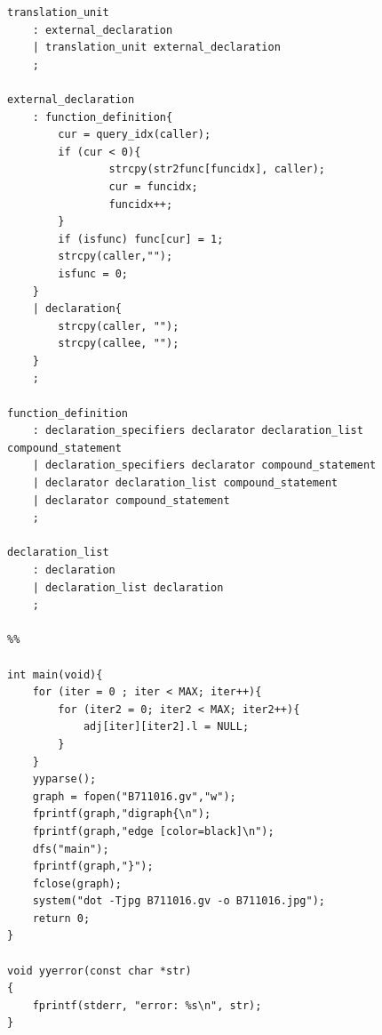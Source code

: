 \documentclass{article}
\begin{document}
\begin{verbatim}
translation_unit
	: external_declaration
	| translation_unit external_declaration
	;

external_declaration 
	: function_definition{
        cur = query_idx(caller);
        if (cur < 0){
                strcpy(str2func[funcidx], caller);
                cur = funcidx;
                funcidx++;
		}
        if (isfunc) func[cur] = 1;
        strcpy(caller,"");
        isfunc = 0;
    }
	| declaration{
    	strcpy(caller, "");
		strcpy(callee, "");
    }
	;

function_definition
	: declaration_specifiers declarator declaration_list compound_statement 
	| declaration_specifiers declarator compound_statement 
	| declarator declaration_list compound_statement 
	| declarator compound_statement 
	;

declaration_list
	: declaration
	| declaration_list declaration
	;

%%

int main(void){
    for (iter = 0 ; iter < MAX; iter++){
        for (iter2 = 0; iter2 < MAX; iter2++){
            adj[iter][iter2].l = NULL;
        }
    }
	yyparse();
	graph = fopen("B711016.gv","w");
	fprintf(graph,"digraph{\n");
    fprintf(graph,"edge [color=black]\n");
    dfs("main");
	fprintf(graph,"}");
	fclose(graph);
    system("dot -Tjpg B711016.gv -o B711016.jpg");
	return 0;
}

void yyerror(const char *str)
{
	fprintf(stderr, "error: %s\n", str);
}

\end{verbatim}
\end{document}
